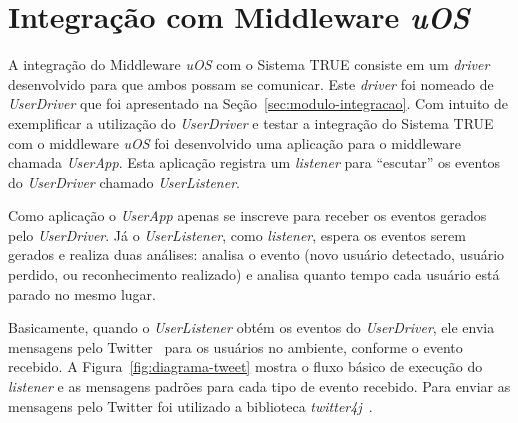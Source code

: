 \section{Integração com Middleware \textit{uOS}}

	A integração do Middleware \textit{uOS} com o Sistema TRUE consiste em um \textit{driver} desenvolvido para que ambos possam se comunicar. Este \textit{driver} foi nomeado de \textit{UserDriver} que foi apresentado na Seção~\ref{sec:modulo-integracao}. Com intuito de exemplificar a utilização do \textit{UserDriver} e testar a integração do Sistema TRUE com o middleware \textit{uOS} foi desenvolvido uma aplicação para o middleware chamada \textit{UserApp}. Esta aplicação registra um \textit{listener} para ``escutar'' os eventos do \textit{UserDriver} chamado \textit{UserListener}. 

	Como aplicação o \textit{UserApp} apenas se inscreve para receber os eventos gerados pelo \textit{UserDriver}. Já o \textit{UserListener}, como \textit{listener}, espera os eventos serem gerados e realiza duas análises: analisa o evento (novo usuário detectado, usuário perdido, ou reconhecimento realizado) e analisa quanto tempo cada usuário está parado no mesmo lugar.



	Basicamente, quando o \textit{UserListener} obtém os eventos do \textit{UserDriver}, ele envia mensagens pelo Twitter~\cite{twitter} para os usuários no ambiente, conforme o evento recebido. A Figura~\ref{fig:diagrama-tweet} mostra o fluxo básico de execução do \textit{listener} e as mensagens padrões para cada tipo de evento recebido. Para enviar as mensagens pelo Twitter foi utilizado a biblioteca \textit{twitter4j}~\cite{twitter4j}. 

